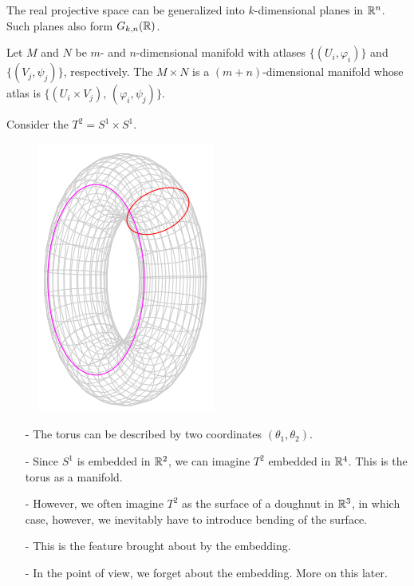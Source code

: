 \documentclass[a4paper, 10pt]{article}
\begin{document}
\begin{remark}
    The real projective space can be generalized into $k$-dimensional planes in $\mathbb{R}^{n}$. Such planes also form  $G_{k,n}(\mathbb{R})$.
\end{remark}
\newpage


\begin{definition}
    Let $M$ and $N$ be $m$- and $n$-dimensional manifold with atlases $\{(U_{i},\varphi_{i})\}$ and $\{(V_{j},\psi_{j})\}$, respectively. The  $M\times N$ is a $(m+n)$-dimensional manifold whose atlas is $\{(U_{i}\times V_{j}),\,(\varphi_{i},\psi_{j})\}$.
\end{definition}

\begin{example}
    Consider the  $T^{2} = S^{1} \times S^{1}$.
    
    \begin{figure}[htbp]
        \centering
        \includegraphics[width=0.3\linewidth]{../images/lecture05/5_03.png}
    \end{figure}

    \begin{itemize}
        \item[-] The torus can be described by two coordinates $(\theta_{1},\theta_{2})$.
        \item[-] Since $S^{1}$ is embedded in $\mathbb{R}^{2}$, we can imagine $T^{2}$ embedded in $\mathbb{R}^{4}$. This is the torus as a  manifold.
        \item[-] However, we often imagine $T^{2}$ as the surface of a doughnut in $\mathbb{R}^{3}$, in which case, however, we inevitably have to introduce bending of the surface.
        \item[-] This is the  feature brought about by the embedding.
        \item[-] In the  point of view, we forget about the embedding. More on this later.
    \end{itemize}
\end{example}
\end{document}
